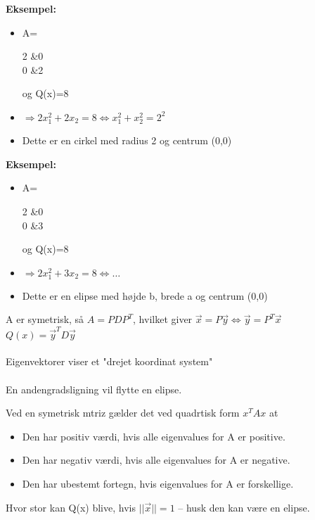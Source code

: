 \documentclass[danish, english]{article}
\begin{document}
\textbf{Eksempel:}
\begin{itemize}
\item A= \begin{ArgMat}
2 &0\\
0 &2
\end{ArgMat} og Q(x)=8 
\item $\Rightarrow 2x_1^2+2x_2=8 \Leftrightarrow x_1^2+x_2^2 = 2^2$
\item Dette er en cirkel med radius 2 og centrum (0,0)
\end{itemize}




\textbf{Eksempel:}
\begin{itemize}
\item A= \begin{ArgMat}
2 &0\\
0 &3
\end{ArgMat} og Q(x)=8 
\item $\Rightarrow 2x_1^2+3x_2=8 \Leftrightarrow \dots$
\item Dette er en elipse med højde b, brede a og centrum (0,0)
\end{itemize}


\begin{theo} 
A er symetrisk, så $A=PDP^T$, hvilket giver $\vec{x}=P\vec{y} \Leftrightarrow \vec{y}=P^T\vec{x}$
\\
$Q(x)=\vec{y}^T D\vec{y}$
\\
\\
Eigenvektorer viser et "drejet koordinat system"
\\
\\
En andengradsligning vil flytte en elipse.
\end{theo}


\begin{theo}[Theorem ?] 
Ved en symetrisk mtriz gælder det ved quadrtisk form $x^T Ax$ at
\begin{itemize}
\item Den har positiv værdi, hvis alle eigenvalues for A er positive.
\item Den har negativ værdi, hvis alle eigenvalues for A er negative.
\item Den har ubestemt fortegn, hvis eigenvalues for A er forskellige.
\end{itemize}
\end{theo}



\begin{theo}[Theorem 6]
Hvor stor kan Q(x) blive, hvis $||\vec{x}||=1$ -- husk den kan være en elipse.
\end{theo}
\end{document}

